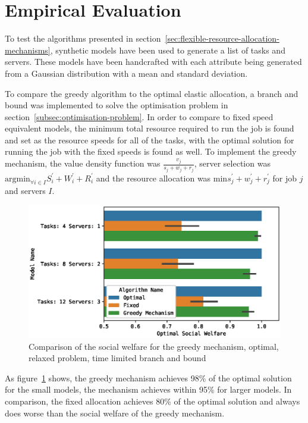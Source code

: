 \section{Empirical Evaluation}\label{sec:empirical-evaluation}
To test the algorithms presented in section~\ref{sec:flexible-resource-allocation-mechanisms}, synthetic models have
been used to generate a list of tasks and servers. These models have been handcrafted with each attribute being
generated from a Gaussian distribution with a mean and standard deviation.

To compare the greedy algorithm to the optimal elastic allocation, a branch and bound was implemented to solve the
optimisation problem in section~\ref{subsec:optimisation-problem}. In order to compare to fixed speed equivalent models,
the minimum total resource required to run the job is found and set as the resource speeds for all of the tasks, with
the optimal solution for running the job with the fixed speeds is found as well. To implement the greedy mechanism, the
value density function was $\frac{v_j}{s_j + w_j + r_j}$, server selection was
$\text{argmin}_{\forall i \in I} S^{'}_i + W^{'}_i + R^{'}_i$ and the resource allocation was
$\text{min} s^{'}_j + w^{'}_j + r^{'}_j$ for job $j$ and servers $I$.

\begin{figure}[h]
    \centering
    \includegraphics[width=\linewidth]{figs/empirical_evidence/greedy_mechanism}
    \caption{Comparison of the social welfare for the greedy mechanism, optimal, relaxed problem, time limited branch and bound}
    \label{fig:greedy_mechanism_comparison}
\end{figure}
As figure~\ref{fig:greedy_mechanism_comparison} shows, the greedy mechanism achieves 98\% of the optimal solution for
the small models, the mechanism achieves within 95\% for larger models. In comparison, the fixed allocation achieves
80\% of the optimal solution and always does worse than the social welfare of the greedy mechanism.


